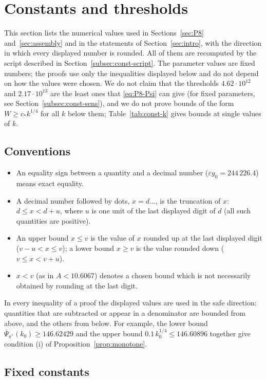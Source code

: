 \documentclass[11pt]{amsart}
\newcommand{\eps}{\varepsilon}
\theoremstyle{definition}
\theoremstyle{remark}
\numberwithin{equation}{section}
\begin{document}
\section{Constants and thresholds}\label{sec:constants}

This section lists the numerical values used in Sections~\ref{sec:P8} and~\ref{sec:assembly} and in the statements
of Section~\ref{sec:intro}, with the direction in which every displayed number is rounded. All of them are
recomputed by the script described in Section~\ref{subsec:const-script}. The parameter values are fixed numbers; the
proofs use only the inequalities displayed below and do not depend on how the values were chosen. We do not claim that the thresholds $4.62\cdot10^{12}$ and $2.17\cdot10^{13}$ are the least ones
that \eqref{eq:P8-Psi} can give (for fixed parameters, see Section~\ref{subsec:const-sens}), and we do not prove bounds of
the form $W\ge c_*k^{1/4}$ for all $k$ below them; Table~\ref{tab:const-k} gives bounds at single values of $k$.

\subsection{Conventions}\label{subsec:const-conv}

\begin{itemize}
\item An equality sign between a quantity and a decimal number ($\eps y_0=244\,226.4$) means exact equality.
\item A decimal number followed by dots, $x=d\ldots$, is the truncation of $x$: $d\le x<d+u$, where $u$ is one unit
  of the last displayed digit of $d$ (all such quantities are positive).
\item An upper bound $x\le v$ is the value of $x$ rounded up at the last displayed digit ($v-u<x\le v$); a lower bound
  $x\ge v$ is the value rounded down ($v\le x<v+u$).
\item $x<v$ (as in $A<10.6067$) denotes a chosen bound which is not necessarily obtained by rounding at the last
  digit.
\end{itemize}
In every inequality of a proof the displayed values are used in the safe direction: quantities that are subtracted or
appear in a denominator are bounded from above, and the others from below. For example, the lower bound
$\bar\Psi_{\pi^*}(k_0)\ge146.62429$ and the upper bound $0.1\,k_0^{1/4}\le146.60896$ together give condition (i) of
Proposition~\ref{prop:monotone}.

\subsection{Fixed constants}\label{subsec:const-fixed}
\end{document}
